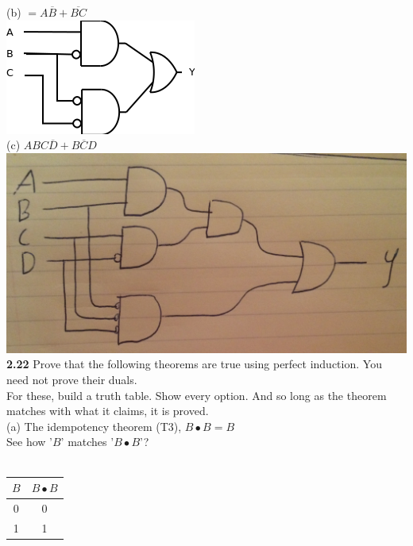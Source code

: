 \documentclass[12pt,a4paper]{report}
\newcommand*{\bl}{\overline{B}}
\newcommand*{\dl}{\overline{D}}
\begin{document}
\begin{normalsize}
(b) $ = A\bl{} + \overline{BC} $ \\
\includegraphics[scale=1]{2_16B} \\

(c) $ ABC\dl{} + \overline{BCD} $ \\
\includegraphics[scale=.15]{2_16D} \\

\textbf{2.22} Prove that the following theorems are true using perfect induction. You need not prove their duals.\\

For these, build a truth table. Show every option. And so long as the theorem matches with what it claims, it is proved. \\

(a) The idempotency theorem (T3), $ B \bullet B = B $ \\
See how '$ B $' matches '$ B \bullet B $'? \\ \\
\begin{tabular}{|c|c|}
$ B $ & $ B \bullet B $ \\ 
\hline 
0 & 0 \\ 
\hline 
1 & 1 \\ 
\hline 
\end{tabular} \\ \\


\end{normalsize}
\end{document}

